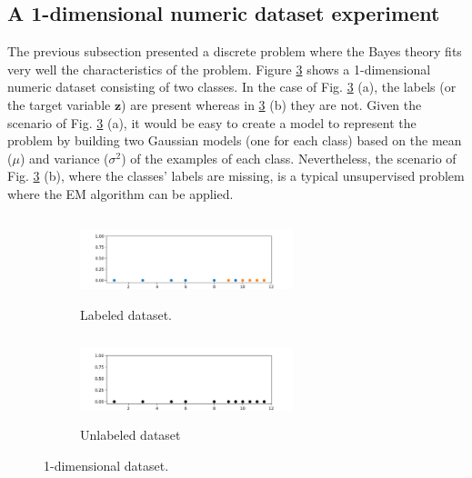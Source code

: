 
\subsection{A 1-dimensional numeric dataset experiment}

The previous subsection presented a discrete problem where the Bayes theory fits very well the characteristics of the problem. Figure \ref{fig:ds} shows a 1-dimensional numeric dataset consisting of two classes. In the case of Fig. \ref{fig:ds} (a), the labels (or the target variable $\mathbf{z}$) are present whereas in \ref{fig:ds} (b) they are not. Given the scenario of Fig. \ref{fig:ds} (a), it would be easy to create a model to represent the problem by building two Gaussian models (one for each class) based on the mean ($\mu$) and variance ($\sigma^{2}$) of the examples of each class. Nevertheless, the scenario of Fig. \ref{fig:ds} (b), where the classes' labels are missing, is a typical unsupervised problem where the EM algorithm can be applied. 

\begin{figure}
\centering
\begin{subfigure}{.5\textwidth}
  \centering
  \includegraphics[width=6.2cm,height=2.5cm]{"Part 3 - Learning Systems/Unsupervised Learning/Expectation-Maximization/figures/lab_dataset.png"}
  \caption{Labeled dataset.}
  \label{fig:lab_ds}
\end{subfigure}%
\begin{subfigure}{.5\textwidth}
  \centering
  \includegraphics[width=6.2cm,height=2.5cm]{"Part 3 - Learning Systems/Unsupervised Learning/Expectation-Maximization/figures/unlab_dataset.png"}
  \caption{Unlabeled dataset}
  \label{fig:unlab_ds}
\end{subfigure}
\caption{1-dimensional dataset.}
\label{fig:ds}
\end{figure}


